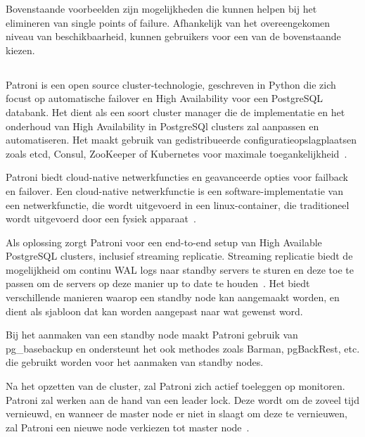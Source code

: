 Bovenstaande voorbeelden zijn mogelijkheden die kunnen helpen bij het elimineren van single points of failure. Afhankelijk van het overeengekomen niveau van beschikbaarheid, kunnen gebruikers voor een van de bovenstaande kiezen.




\subsection{}
\label{subsec:Patroni}


Patroni is een open source cluster-technologie, geschreven in Python die zich focust op automatische failover en High Availability voor een PostgreSQL databank. Het dient als een soort cluster manager die de implementatie en het onderhoud van High Availability in PostgreSQl clusters zal aanpassen en automatiseren. Het maakt gebruik van gedistribueerde configuratieopslagplaatsen zoals etcd, Consul, ZooKeeper of Kubernetes voor maximale toegankelijkheid~\autocite{Markwort2018}.


Patroni biedt cloud-native netwerkfuncties en geavanceerde opties voor failback en failover. Een cloud-native netwerkfunctie is een software-implementatie van een netwerkfunctie, die wordt uitgevoerd in een linux-container, die traditioneel wordt uitgevoerd door een fysiek apparaat~\autocite{CDNF2020}.

Als oplossing zorgt Patroni voor een end-to-end setup van High Available PostgreSQL clusters, inclusief streaming replicatie. Streaming replicatie biedt de mogelijkheid om continu WAL logs naar standby servers te sturen en deze toe te passen om de servers op deze manier up to date te houden~\autocite{2020}. %
Het biedt verschillende manieren waarop een standby node kan aangemaakt worden, en dient als sjabloon dat kan worden aangepast naar wat gewenst word.

Bij het aanmaken van een standby node maakt Patroni gebruik van pg\_basebackup en ondersteunt het ook methodes zoals Barman, pgBackRest, etc. die gebruikt worden voor het aanmaken van standby nodes.

Na het opzetten van de cluster, zal Patroni zich actief toeleggen op monitoren. Patroni zal werken aan de hand van een leader lock. Deze wordt om de zoveel tijd vernieuwd, en wanneer de master node er niet in slaagt om deze te vernieuwen, zal Patroni een nieuwe node verkiezen tot master node~\autocite{ScaleGrid2018}. %

